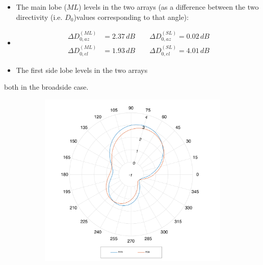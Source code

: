 \documentclass[12pt,a4paper]{article}
\begin{document}
{\begin{itemize}
	\begin{itemize}
		\item The main lobe ($ML$) levels in the two arrays (as a difference between the two directivity (i.e. $D_0$)values corresponding to that angle): 
		\item 
		\begin{equation}
			\begin{aligned}
				\Delta D_{0,az}^{(ML)} &= 2.37\,dB\qquad \Delta D_{0,az}^{(SL)} = 0.02\,dB\\
				\Delta D_{0,el}^{(ML)} &= 1.93\,dB\qquad \Delta D_{0,el}^{(SL)} = 4.01\,dB
			\end{aligned}
		\end{equation}
		\item The first side lobe levels in the two arrays
	\end{itemize}
	both in the broadside case. 
\end{itemize}
\begin{figure}[h]
	\begin{center}
		\begin{subfigure}{0.5\linewidth}
			\includegraphics[scale=0.3]{pifa_pcb_null_azymuth_comparison.pdf}
			\caption{}
		\end{subfigure}
		\begin{subfigure}{0.5\linewidth}

\end{subfigure}
\end{center}
\end{figure}}
\end{document}
